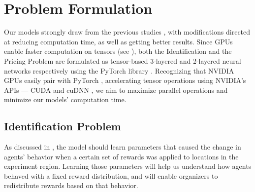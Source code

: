 \chapter{Problem Formulation} \label{sec:Problem Formulation}
Our models strongly draw from the previous studies \cite{Xue2016Avi2, Xue2016Avi1}, with modifications directed at reducing computation time, as well as getting better results. Since GPUs enable faster computation on tensors (see ), both the Identification and the Pricing Problem are formulated as tensor-based 3-layered and 2-layered neural networks respectively using the PyTorch library \cite{PTDocs}. Recognizing that NVIDIA GPUs easily pair with PyTorch \cite{PTDocs}, accelerating tensor operations using NVIDIA's APIs --- CUDA and cuDNN \cite{CUDADocs, cuDNNPaper}, we aim to maximize parallel operations and minimize our models' computation time.

\section{Identification Problem} \label{sec:Identification Problem}
As discussed in , the model should learn parameters that caused the change in agents' behavior when a certain set of rewards was applied to locations in the experiment region. Learning those parameters will help us understand how agents behaved with a fixed reward distribution, and will enable organizers to redistribute rewards based on that behavior.

